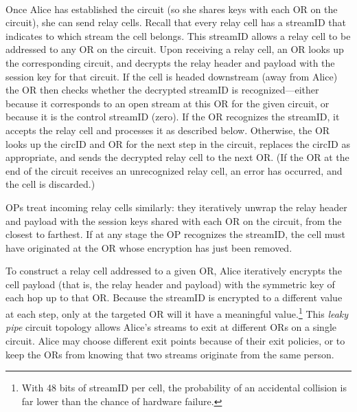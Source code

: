 \documentclass[times,10pt,twocolumn]{article}
\begin{document}
\\
%
Once Alice has established the circuit (so she shares keys with each
OR on the circuit), she can send relay cells.  Recall that every relay
cell has a streamID that indicates to which
stream the cell belongs.  This streamID allows a relay cell to be
addressed to any OR on the circuit.  Upon receiving a relay
cell, an OR looks up the corresponding circuit, and decrypts the relay
header and payload with the session key for that circuit.
If the cell is headed downstream (away from Alice) the OR then checks
whether the decrypted streamID is recognized---either because it
corresponds to an open stream at this OR for the given circuit, or because
it is the control streamID (zero).  If the OR recognizes the
streamID, it accepts the relay cell and processes it as described
below.  Otherwise,
the OR looks up the circID and OR for the
next step in the circuit, replaces the circID as appropriate, and
sends the decrypted relay cell to the next OR.  (If the OR at the end
of the circuit receives an unrecognized relay cell, an error has
occurred, and the cell is discarded.)

OPs treat incoming relay cells similarly: they iteratively unwrap the
relay header and payload with the session keys shared with each
OR on the circuit, from the closest to farthest. %
If at any stage the OP recognizes the streamID, the cell must have
originated at the OR whose encryption has just been removed.

To construct a relay cell addressed to a given OR, Alice iteratively
encrypts the cell payload (that is, the relay header and payload) with
the symmetric key of each hop up to that OR.  Because the streamID is
encrypted to a different value at each step, only at the targeted OR
will it have a meaningful value.\footnote{
With 48 bits of streamID per cell, the probability of an accidental
collision is far lower than the chance of hardware failure.}
This \emph{leaky pipe} circuit topology
allows Alice's streams to exit at different ORs on a single circuit.
Alice may choose different exit points because of their exit policies,
or to keep the ORs from knowing that two streams
originate from the same person.
\end{document}
